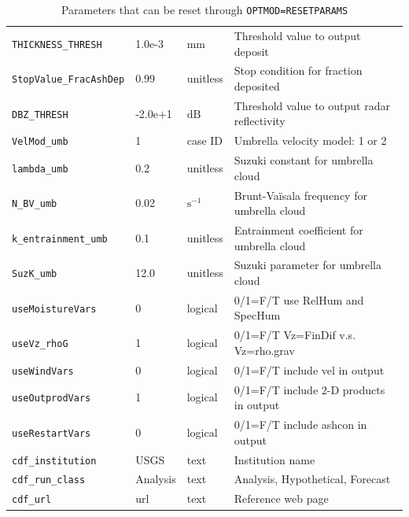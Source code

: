 \begin{table}[htbp]
\begin{center}
\begin{tabular}{| l | l | l | l |}
\texttt{THICKNESS\_THRESH} & 1.0e-3   & $\mathrm{mm}$      &  Threshold value to output deposit \\
\texttt{StopValue\_FracAshDep} & 0.99 & unitless           &  Stop condition for fraction deposited \\
\texttt{DBZ\_THRESH}       & -2.0e+1  & $\mathrm{dB}$      &  Threshold value to output radar reflectivity \\
\texttt{VelMod\_umb}       & 1        & case ID            &  Umbrella velocity model: 1 \cite{Costa14} or 2 \cite{Webster20} \\
\texttt{lambda\_umb}       & 0.2      & unitless           &  Suzuki constant for umbrella cloud \\
\texttt{N\_BV\_umb}        & 0.02     & $\mathrm{s^{-1}}$  &  Brunt-Va\"isala frequency for umbrella cloud \\
\texttt{k\_entrainment\_umb} & 0.1    & unitless           &  Entrainment coefficient for umbrella cloud \\
\texttt{SuzK\_umb}         & 12.0     & unitless           &  Suzuki parameter for umbrella cloud \\
\texttt{useMoistureVars}   & 0        & logical            &  0/1=F/T use RelHum and SpecHum \\
\texttt{useVz\_rhoG}       & 1        & logical            &  0/1=F/T Vz=FinDif v.s. Vz=rho.grav \\
\texttt{useWindVars}       & 0        & logical            &  0/1=F/T include vel in output \\
\texttt{useOutprodVars}    & 1        & logical            &  0/1=F/T include 2-D products in output \\
\texttt{useRestartVars}    & 0        & logical            &  0/1=F/T include ashcon in output \\
\texttt{cdf\_institution}  & USGS     & text               &  Institution name \\
\texttt{cdf\_run\_class}   & Analysis & text               &  Analysis, Hypothetical, Forecast \\
\texttt{cdf\_url}          & url      & text               &  Reference web page \\
\hline
\end{tabular}
\caption{\label{tab:ResetParam}Parameters that can be reset through \texttt{OPTMOD=RESETPARAMS}}
\end{center}
\end{table}
\normalsize

